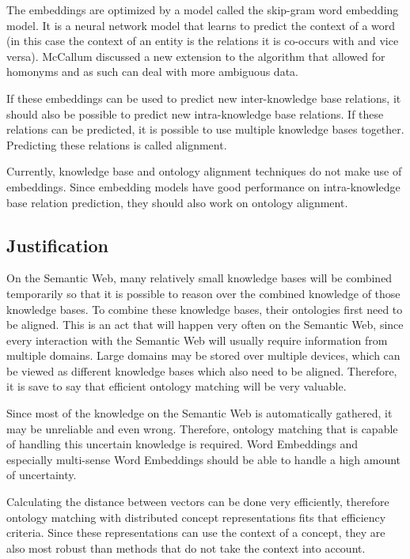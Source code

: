 \documentclass{article}
\begin{document}
 The embeddings are optimized by a model called the skip-gram word embedding model. It is a neural network model that learns to predict the context of a word (in this case the context of an entity is the relations it is co-occurs with and vice versa). McCallum discussed a new extension to the algorithm that allowed for homonyms and as such can deal with more ambiguous data\cite{mccallumweblecture}.
 
 If these embeddings can be used to predict new inter-knowledge base relations, it should also be possible to predict new intra-knowledge base relations. If these relations can be predicted, it is possible to use multiple knowledge bases together. Predicting these relations is called alignment.
 
 Currently, knowledge base and ontology alignment techniques do not make use of embeddings. Since embedding models have good performance on intra-knowledge base relation prediction, they should also work on ontology alignment.
 
 \subsection{Justification}
 On the Semantic Web, many relatively small knowledge bases will be combined temporarily so that it is possible to reason over the combined knowledge of those knowledge bases. To combine these knowledge bases, their ontologies first need to be aligned. This is an act that will happen very often on the Semantic Web, since every interaction with the Semantic Web will usually require information from multiple domains. Large domains may be stored over multiple devices, which can be viewed as different knowledge bases which also need to be aligned. Therefore, it is save to say that efficient ontology matching will be very valuable.
 
 Since most of the knowledge on the Semantic Web is automatically gathered, it may be unreliable and even wrong. Therefore, ontology matching that is capable of handling this uncertain knowledge is required. Word Embeddings and especially multi-sense Word Embeddings should be able to handle a high amount of uncertainty.
 
 Calculating the distance between vectors can be done very efficiently, therefore ontology matching with distributed concept representations fits that efficiency criteria. Since these representations can use the context of a concept, they are also most robust than methods that do not take the context into account.
 
\end{document}
